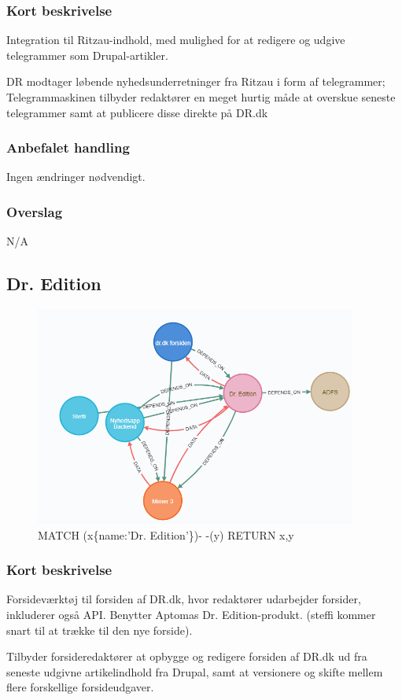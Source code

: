 \documentclass{article}
\begin{document}
\subsubsection{Kort beskrivelse}
Integration til Ritzau-indhold, med mulighed for at redigere og udgive telegrammer som Drupal-artikler.	

DR modtager løbende nyhedsunderretninger fra Ritzau i form af telegrammer; Telegrammaskinen tilbyder redaktører en meget hurtig måde at overskue seneste telegrammer samt at publicere disse direkte på DR.dk
\subsubsection{Anbefalet handling}
Ingen ændringer nødvendigt.
\subsubsection{Overslag}
N/A

\subsection{Dr. Edition}
\begin{figure}[h]
\includegraphics[width=300pt]{DrEdition.PNG}
\caption{MATCH (x\{name:'Dr. Edition'\})- -(y) RETURN x,y}
\end{figure}
\subsubsection{Kort beskrivelse}
Forsideværktøj til forsiden af DR.dk, hvor redaktører udarbejder forsider, inkluderer også API. Benytter Aptomas Dr. Edition-produkt. (steffi kommer snart til at trække til den nye forside). 

Tilbyder forsideredaktører at opbygge og redigere forsiden af DR.dk ud fra seneste udgivne artikelindhold fra Drupal, samt at versionere og skifte mellem flere forskellige forsideudgaver.
\end{document}
